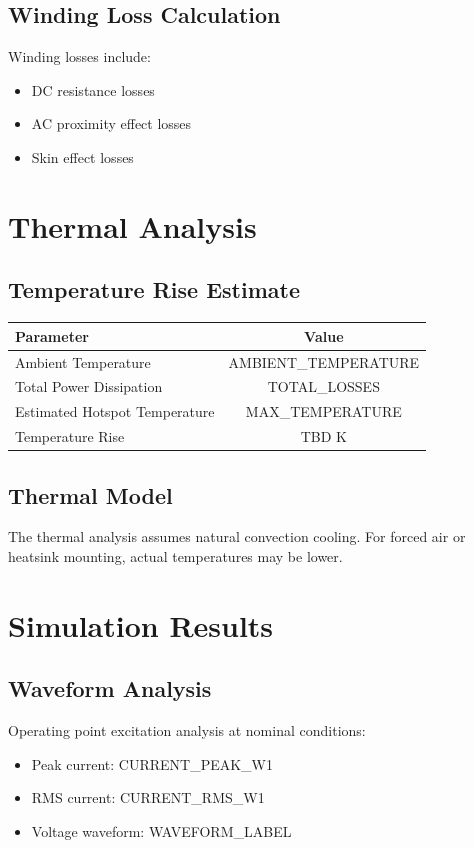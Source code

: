 \documentclass[11pt,a4paper]{article}
\begin{document}
\subsection{Winding Loss Calculation}
Winding losses include:
\begin{itemize}
    \item DC resistance losses
    \item AC proximity effect losses
    \item Skin effect losses
\end{itemize}

\section{Thermal Analysis}

\subsection{Temperature Rise Estimate}
\begin{longtable}{|l|c|}
\hline
\textbf{Parameter} & \textbf{Value} \\
\hline
Ambient Temperature & {{AMBIENT_TEMPERATURE}} \\
\hline
Total Power Dissipation & {{TOTAL_LOSSES}} \\
\hline
Estimated Hotspot Temperature & {{MAX_TEMPERATURE}} \\
\hline
Temperature Rise & TBD K \\
\hline
\end{longtable}

\subsection{Thermal Model}
The thermal analysis assumes natural convection cooling. For forced air or heatsink mounting, actual temperatures may be lower.

\section{Simulation Results}

\subsection{Waveform Analysis}
Operating point excitation analysis at nominal conditions:
\begin{itemize}
    \item Peak current: {{CURRENT_PEAK_W1}}
    \item RMS current: {{CURRENT_RMS_W1}}
    \item Voltage waveform: {{WAVEFORM_LABEL}}
\end{itemize}
\end{document}
